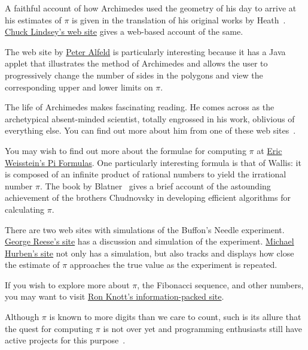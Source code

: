 \documentclass[11pt,a4paper,onecolumn]{article}
\begin{document}
A faithful account of how Archimedes used the geometry of his day to
arrive at his estimates of $\pi$ is given in the translation of his
original works by Heath~\cite{heath02}. 
\href{http://itech.fgcu.edu/faculty/clindsey/mhf4404/archimedes/archimedes.html}{Chuck
Lindsey's web site} gives a web-based account of the same. 

The web site by
\href{http://www.math.utah.edu/~alfeld/Archimedes/Archimedes.html}{Peter
Alfeld} is particularly interesting because it has a Java applet that
illustrates the method of Archimedes and allows the user to
progressively change the number of sides in the polygons and view the
corresponding upper and lower limits on $\pi$.

The life of Archimedes makes fascinating reading.  He comes across as the archetypical absent-minded scientist, totally engrossed in his work, oblivious of everything else.  You can find out more about him from one of these web sites~\cite{mactutor_history,golba_archi}.

You may wish to find out more about the formulae for computing $\pi$ at \href{http://mathworld.wolfram.com/PiFormulas.html}{Eric Weisstein's Pi Formulas}.  One particularly interesting formula is that of Wallis: it is composed of an infinite product of rational numbers to yield the irrational number $\pi$.  The book by Blatner~\cite{blat97} gives a brief account of the astounding achievement of the brothers Chudnovsky in developing efficient algorithms for calculating $\pi$. 

There are two web sites with simulations of the Buffon's Needle
experiment. \href{http://www.mste.uiuc.edu/reese/buf
fon/buffon.html}{George Reese's site} has a discussion and simulation
of the experiment.  \href{http://www.angelfire.com/wa/hurben
/buff.html}{Michael Hurben's site} not only has a simulation, but also
tracks and displays how close the estimate of $\pi$ approaches the true
value as the experiment is repeated.

If you wish to explore more about $\pi$, the Fibonacci sequence, and
other numbers, you may want to visit
\href{http://www.mcs.surrey.ac.uk/Person
al/R.Knott/Fibonacci/fibpi.html}{Ron Knott's information-packed site}.

Although $\pi$ is known to more digits than we care to count, such is its allure that the quest for computing $\pi$ is not over yet and programming enthusiasts still have active projects for this purpose~\cite{pi_comp}.


%

%
\end{document}
